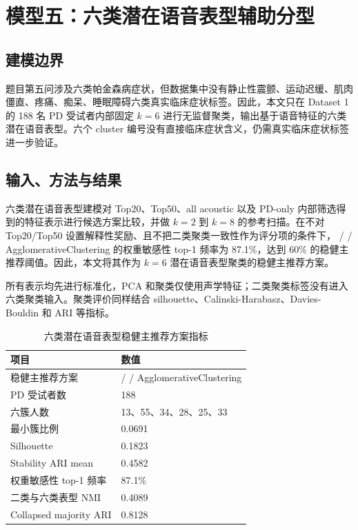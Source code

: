 \section{模型五：六类潜在语音表型辅助分型}

\subsection{建模边界}

题目第五问涉及六类帕金森病症状，但数据集中没有静止性震颤、运动迟缓、肌肉僵直、疼痛、痴呆、睡眠障碍六类真实临床症状标签。因此，本文只在 Dataset 1 的 188 名 PD 受试者内部固定 \(k=6\) 进行无监督聚类，输出基于语音特征的六类潜在语音表型。六个 cluster 编号没有直接临床症状含义，仍需真实临床症状标签进一步验证。

\subsection{输入、方法与结果}

六类潜在语音表型建模对 Top20、Top50、all acoustic 以及 PD-only 内部筛选得到的特征表示进行候选方案比较，并做 \(k=2\) 到 \(k=8\) 的参考扫描。在不对 Top20/Top50 设置解释性奖励、且不把二类聚类一致性作为评分项的条件下， /  / AgglomerativeClustering 的权重敏感性 top-1 频率为 87.1\%，达到 60\% 的稳健主推荐阈值。因此，本文将其作为 \(k=6\) 潜在语音表型聚类的稳健主推荐方案。

所有表示均先进行标准化，PCA 和聚类仅使用声学特征；二类聚类标签没有进入六类聚类输入。聚类评价同样结合 silhouette、Calinski-Harabasz、Davies-Bouldin 和 ARI 等指标。

\begin{table}[H]
\centering
\caption{六类潜在语音表型稳健主推荐方案指标}
\begin{tabularx}{\textwidth}{lY}
\toprule
项目 & 数值 \\
\midrule
稳健主推荐方案 &  /  / AgglomerativeClustering \\
PD 受试者数 & 188 \\
六簇人数 & 13、55、34、28、25、33 \\
最小簇比例 & 0.0691 \\
Silhouette & 0.1823 \\
Stability ARI mean & 0.4582 \\
权重敏感性 top-1 频率 & 87.1\% \\
二类与六类表型 NMI & 0.4089 \\
Collapsed majority ARI & 0.8128 \\
\bottomrule
\end{tabularx}
\end{table}

